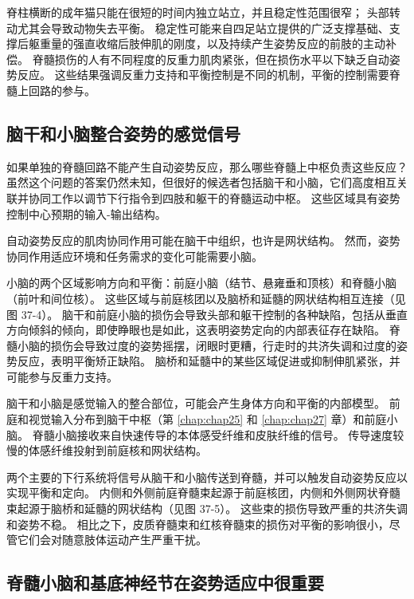 脊柱横断的成年猫只能在很短的时间内独立站立，并且稳定性范围很窄；
头部转动尤其会导致动物失去平衡。
稳定性可能来自四足站立提供的广泛支撑基础、支撑后躯重量的强直收缩后肢伸肌的刚度，以及持续产生姿势反应的前肢的主动补偿。
脊髓损伤的人有不同程度的反重力肌肉紧张，但在损伤水平以下缺乏自动姿势反应。
这些结果强调反重力支持和平衡控制是不同的机制，平衡的控制需要脊髓上回路的参与。



\subsection{脑干和小脑整合姿势的感觉信号}

如果单独的脊髓回路不能产生自动姿势反应，那么哪些脊髓上中枢负责这些反应？
虽然这个问题的答案仍然未知，但很好的候选者包括脑干和小脑，它们高度相互关联并协同工作以调节下行指令到四肢和躯干的脊髓运动中枢。
这些区域具有姿势控制中心预期的输入-输出结构。


自动姿势反应的肌肉协同作用可能在脑干中组织，也许是网状结构。
然而，姿势协同作用适应环境和任务需求的变化可能需要小脑。


小脑的两个区域影响方向和平衡：前庭小脑（结节、悬雍垂和顶核）和脊髓小脑（前叶和间位核）。
这些区域与前庭核团以及脑桥和延髓的网状结构相互连接（见图 37-4）。
脑干和前庭小脑的损伤会导致头部和躯干控制的各种缺陷，包括从垂直方向倾斜的倾向，即使睁眼也是如此，这表明姿势定向的内部表征存在缺陷。
脊髓小脑的损伤会导致过度的姿势摇摆，闭眼时更糟，行走时的共济失调和过度的姿势反应，表明平衡矫正缺陷。
脑桥和延髓中的某些区域促进或抑制伸肌紧张，并可能参与反重力支持。


脑干和小脑是感觉输入的整合部位，可能会产生身体方向和平衡的内部模型。
前庭和视觉输入分布到脑干中枢（第 \ref{chap:chap25} 和 \ref{chap:chap27} 章）和前庭小脑。
脊髓小脑接收来自快速传导的本体感受纤维和皮肤纤维的信号。
传导速度较慢的体感纤维投射到前庭核和网状结构。


两个主要的下行系统将信号从脑干和小脑传送到脊髓，并可以触发自动姿势反应以实现平衡和定向。
内侧和外侧前庭脊髓束起源于前庭核团，内侧和外侧网状脊髓束起源于脑桥和延髓的网状结构（见图 37-5）。
这些束的损伤导致严重的共济失调和姿势不稳。
相比之下，皮质脊髓束和红核脊髓束的损伤对平衡的影响很小，尽管它们会对随意肢体运动产生严重干扰。



\subsection{脊髓小脑和基底神经节在姿势适应中很重要}

